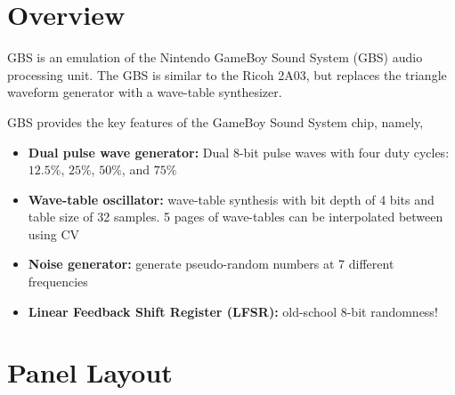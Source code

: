 \documentclass[12pt,letter]{article}
\begin{document}


\section*{Overview}

GBS is an emulation of the Nintendo GameBoy Sound System (GBS) audio processing unit. The GBS is similar to the Ricoh 2A03, but replaces the triangle waveform generator with a wave-table synthesizer.

GBS provides the key features of the GameBoy Sound System chip, namely,
\begin{itemize}
  \item \textbf{Dual pulse wave generator:} Dual 8-bit pulse waves with four duty cycles: $12.5\%$, $25\%$, $50\%$, and $75\%$
  \item \textbf{Wave-table oscillator:} wave-table synthesis with bit depth of 4 bits and table size of 32 samples. 5 pages of wave-tables can be interpolated between using CV
  \item \textbf{Noise generator:} generate pseudo-random numbers at 7 different frequencies
  \item \textbf{Linear Feedback Shift Register (LFSR):} old-school 8-bit randomness!
\end{itemize}


\clearpage
\section*{Panel Layout}
\end{document}
